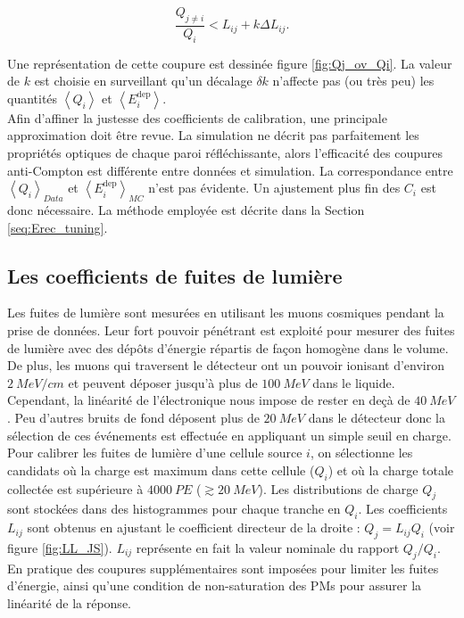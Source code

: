 \begin{equation}
    \frac{Q_{j \neq i}}{Q_i} < L_{ij} + k\Delta L_{ij}.
\end{equation}

\bigbreak

Une représentation de cette coupure est dessinée figure \ref{fig:Qj_ov_Qi}. La valeur de $k$ est choisie en surveillant qu'un décalage $\delta k$ n'affecte pas (ou très peu) les quantités $\left<Q_i\right>$ et $\left<E_i^{\textrm{dep}}\right>$.\\

Afin d'affiner la justesse des coefficients de calibration, une principale approximation doit être revue. La simulation ne décrit pas parfaitement les propriétés optiques de chaque paroi réfléchissante, alors l'efficacité des coupures anti-Compton est différente entre données et simulation. La correspondance entre $\left<Q_i\right>_{Data}$ et $\left<E_i^{\textrm{dep}}\right>_{MC}$ n'est pas évidente. Un ajustement plus fin des $C_i$ est donc nécessaire. La méthode employée est décrite dans la Section \ref{seq:Erec_tuning}.

\subsection{Les coefficients de fuites de lumière}
\label{sec:LL_JS}

Les fuites de lumière sont mesurées en utilisant les muons cosmiques pendant la prise de données. Leur fort pouvoir pénétrant est exploité pour mesurer des fuites de lumière avec des dépôts d'énergie répartis de façon homogène dans le volume. De plus, les muons qui traversent le détecteur ont un pouvoir ionisant d'environ $\SI{2}{MeV/cm}$ et peuvent déposer jusqu'à plus de $\SI{100}{MeV}$ dans le liquide. Cependant, la linéarité de l'électronique nous impose de rester en deçà de $\SI{40}{MeV}$. Peu d'autres bruits de fond déposent plus de $\SI{20}{MeV}$ dans le détecteur donc la sélection de ces événements est effectuée en appliquant un simple seuil en charge.\\

Pour calibrer les fuites de lumière d'une cellule source $i$, on sélectionne les candidats où la charge est maximum dans cette cellule ($Q_i$) et où la charge totale collectée est supérieure à $\SI{4000}{PE}$ ($\gtrsim \SI{20}{MeV}$). Les distributions de charge $Q_j$ sont stockées dans des histogrammes pour chaque tranche en $Q_i$. Les coefficients $L_{ij}$ sont obtenus en ajustant le coefficient directeur de la droite : $Q_j = L_{ij} Q_i$ (voir figure \ref{fig:LL_JS}). $L_{ij}$ représente en fait la valeur nominale du rapport $Q_j/Q_i$. En pratique des coupures supplémentaires sont imposées pour limiter les fuites d'énergie, ainsi qu'une condition de non-saturation des PMs pour assurer la linéarité de la réponse.\\


